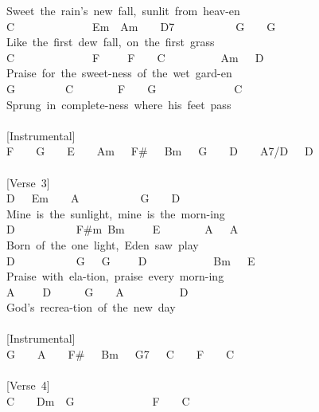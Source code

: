 \documentclass[]{book}
\begin{document}
Sweet~the~rain's~new~fall,~sunlit~from~heav-en\\
C~~~~~~~~~~~~~~Em~~Am~~~~D7~~~~~~~~~~~G~~~~G\\
Like~the~first~dew~fall,~on~the~first~grass\\
C~~~~~~~~~~~~~~F~~~~~F~~~~C~~~~~~~~~~Am~~~D\\
Praise~for~the~sweet-ness~of~the~wet~gard-en\\
G~~~~~~~~~C~~~~~~~~F~~~~G~~~~~~~~~~~~~~C\\
Sprung~in~complete-ness~where~his~feet~pass\\
~\\
{[}Instrumental{]}\\
F~~~~G~~~~E~~~~Am~~~F\#~~~Bm~~~G~~~~D~~~~A7/D~~~D\\
~\\
{[}Verse~3{]}\\
\hspace*{0.333em}\hspace*{0.333em}\hspace*{0.333em}\hspace*{0.333em}\hspace*{0.333em}\hspace*{0.333em}\hspace*{0.333em}\hspace*{0.333em}\hspace*{0.333em}\hspace*{0.333em}\hspace*{0.333em}\hspace*{0.333em}D~~~Em~~~~A~~~~~~~~~~~G~~~~D\\
Mine~is~the~sunlight,~mine~is~the~morn-ing\\
D~~~~~~~~~~~F\#m~Bm~~~~~E~~~~~~~~A~~~A\\
Born~of~the~one~light,~Eden~saw~play\\
D~~~~~~~~~~~G~~~G~~~~~D~~~~~~~~~~~~Bm~~~E\\
Praise~with~ela-tion,~praise~every~morn-ing\\
A~~~~~D~~~~~~G~~~~A~~~~~~~~~~D\\
God's~recrea-tion~of~the~new~day\\
~\\
{[}Instrumental{]}\\
G~~~~A~~~~F\#~~~Bm~~~G7~~~C~~~~F~~~~C\\
~\\
{[}Verse~4{]}\\
\hspace*{0.333em}\hspace*{0.333em}\hspace*{0.333em}\hspace*{0.333em}\hspace*{0.333em}\hspace*{0.333em}\hspace*{0.333em}\hspace*{0.333em}\hspace*{0.333em}\hspace*{0.333em}\hspace*{0.333em}\hspace*{0.333em}C~~~~Dm~~G~~~~~~~~~~~~~~F~~~~C\\
\end{document}
